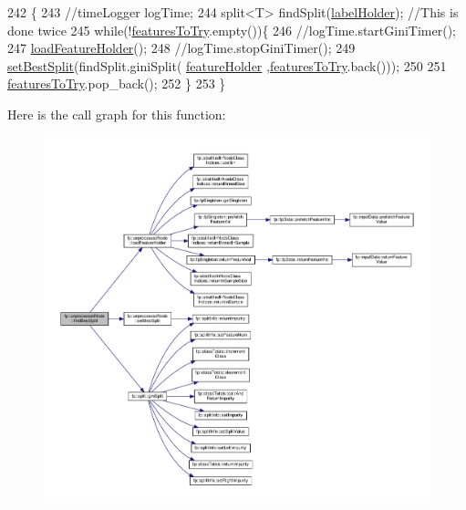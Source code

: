 \begin{DoxyCode}
242                                            \{
243                     \textcolor{comment}{//timeLogger logTime;}
244                     split<T> findSplit(\hyperlink{classfp_1_1unprocessedNode_a2aa2f9dcba0b0a859457ed22e147f698}{labelHolder}); \textcolor{comment}{//This is done twice}
245                     \textcolor{keywordflow}{while}(!\hyperlink{classfp_1_1unprocessedNode_ab625569c5339dfbe93b487765f530313}{featuresToTry}.empty())\{
246                     \textcolor{comment}{//logTime.startGiniTimer();}
247                         \hyperlink{classfp_1_1unprocessedNode_a8cedeb8c4c88345ff97f9afb89b3ccd0}{loadFeatureHolder}();
248                     \textcolor{comment}{//logTime.stopGiniTimer();}
249                         \hyperlink{classfp_1_1unprocessedNode_ae7ad0b6bf8142ea5d3d851e29b5b9aee}{setBestSplit}(findSplit.giniSplit(
      \hyperlink{classfp_1_1unprocessedNode_ac2a435f6f38c5c0d2b4ba4b721fd5eaa}{featureHolder} ,\hyperlink{classfp_1_1unprocessedNode_ab625569c5339dfbe93b487765f530313}{featuresToTry}.back()));
250     
251                         \hyperlink{classfp_1_1unprocessedNode_ab625569c5339dfbe93b487765f530313}{featuresToTry}.pop\_back();
252                     \}
253                 \}
\end{DoxyCode}
Here is the call graph for this function\+:
\nopagebreak
\begin{figure}[H]
\begin{center}
\leavevmode
\includegraphics[width=350pt]{classfp_1_1unprocessedNode_a5fea1583d2250e14470d92568b57e60c_cgraph}
\end{center}
\end{figure}
\mbox{\label{classfp_1_1unprocessedNode_a5fea1583d2250e14470d92568b57e60c}} 
